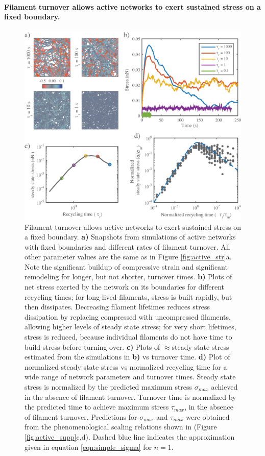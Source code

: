 \documentclass[10pt,letterpaper]{article}
\begin{document}
\paragraph{Filament turnover allows active networks to exert sustained stress on a fixed boundary.}

\begin{figure}[h!]
	\centering
	\includegraphics[width=\hsize]{figures/figure7}
	\caption{\label{fig:active_rec} Filament turnover allows active networks to exert sustained stress on a fixed boundary. \textbf{a)} Snapshots from simulations of active networks with fixed boundaries and different rates of filament turnover.  All other parameter values are the same as in Figure \ref{fig:active_str}a. Note the significant buildup of compressive strain and significant remodeling for longer, but not shorter, turnover times. \textbf{b)} Plots of net stress exerted by the network on its boundaries for different recycling times; for long-lived filaments, stress is built rapidly, but then dissipates. Decreasing filament lifetimes reduces stress dissipation by replacing compressed with uncompressed filaments, allowing higher levels of steady state stress; for very short lifetimes, stress is reduced, because individual filaments do not have time to build stress before turning over. \textbf{c)} Plots of $\approx$steady state stress estimated from the simulations in \textbf{b)} vs turnover time.  \textbf{d)} Plot of normalized steady state stress vs normalized recycling time for a wide range of network parameters and turnover times.  Steady state stress is normalized by the predicted maximum stress $\sigma_{max}$ achieved in the absence of filament turnover.  Turnover time is normalized by the predicted time to achieve maximum stress $\tau_{max}$, in the absence of filament turnover.  Predictions for $\sigma_{max}$ and $\tau_{max}$  were obtained from the phenomenological scaling relations shown in (Figure \ref{fig:active_supp}c,d). Dashed blue line indicates the approximation given in equation \ref{eqn:simple_sigma} for $n=1$.}
\end{figure}
\end{document}
